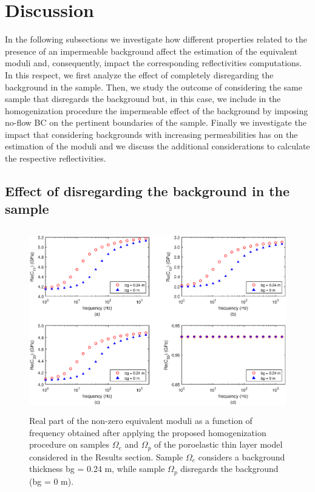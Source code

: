 \documentclass[draft]{agujournal2019}
\begin{document}
\section{Discussion}
In the following subsections we investigate how different properties related to the presence of an impermeable background affect the estimation of the equivalent moduli and, consequently, impact the corresponding reflectivities computations. In this respect, we first analyze the effect of completely disregarding the background in the sample. Then, we study the outcome of considering the same sample that disregards the background but, in this case, we include in the homogenization procedure the impermeable effect of the background by imposing no-flow BC on the pertinent boundaries of the sample. Finally we investigate the impact that considering backgrounds with increasing permeabilities has on the estimation of the moduli and we discuss the additional considerations to calculate the respective reflectivities.

\subsection{Effect of disregarding the background in the sample}

\begin{figure}[!ht]
\centering
        \includegraphics[width= 120mm, height=80mm]{Figure4.eps}
\caption{Real part of the non-zero equivalent moduli as a function of frequency obtained after applying the proposed homogenization procedure on samples $\Omega_e$ and $\Omega_p$ of the poroelastic thin layer model considered in the Results section. Sample $\Omega_e$ considers a background thickness bg = 0.24 m, while sample $\Omega_p$ disregards the background (bg = 0 m). }
\label{fig.4}
\end{figure}
\end{document}
